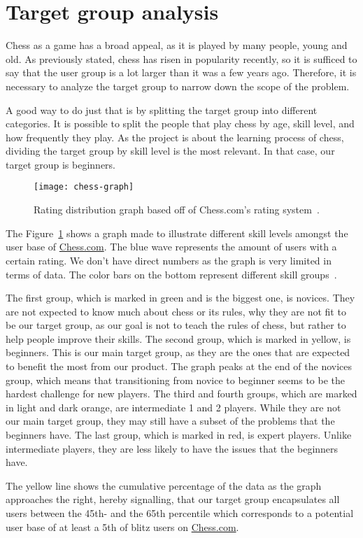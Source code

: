 \section{Target group analysis}\label{sec:target-group-analysis}

Chess as a game has a broad appeal, as it is played by many people, young and old.
As previously stated, chess has risen in popularity recently, so it is sufficed to say that the user group is a lot
larger than it was a few years ago.
Therefore, it is necessary to analyze the target group to narrow down the scope of the problem.

A good way to do just that is by splitting the target group into different categories.
It is possible to split the people that play chess by age, skill level, and how frequently they play.
As the project is about the learning process of chess, dividing the target group by skill level is the most relevant.
In that case, our target group is beginners.

\begin{figure}
    \centering
    \texttt{[image: chess-graph]}
    \caption{Rating distribution graph based off of Chess.com's rating system~\cite{chess-ratings}.}\label{fig:graph}
\end{figure}

The Figure~\ref{fig:graph} shows a graph made to illustrate different skill levels amongst the user base
of \url{Chess.com}.
The blue wave represents the amount of users with a certain rating.
We don't have direct numbers as the graph is very limited in terms of data.
The color bars on the bottom represent different skill groups~\cite{chess-ratings}.

The first group, which is marked in green and is the biggest one, is novices.
They are not expected to know much about chess or its rules, why they are not fit to be our target group, as our
goal is not to teach the rules of chess, but rather to help people improve their skills.
The second group, which is marked in yellow, is beginners.
This is our main target group, as they are the ones that are expected to benefit the most from our product.
The graph peaks at the end of the novices group, which means that transitioning from novice to beginner seems to be the 
hardest challenge for new players.
The third and fourth groups, which are marked in light and dark orange, are intermediate 1 and 2 players.
While they are not our main target group, they may still have a subset of the problems that the beginners have.
The last group, which is marked in red, is expert players.
Unlike intermediate players, they are less likely to have the issues that the beginners have.

The yellow line shows the cumulative percentage of the data as the graph approaches the right, hereby signalling, that
our target group encapsulates all users between the 45th- and the 65th percentile which corresponds to a potential user
base of at least a 5th of blitz users on \url{Chess.com}.

